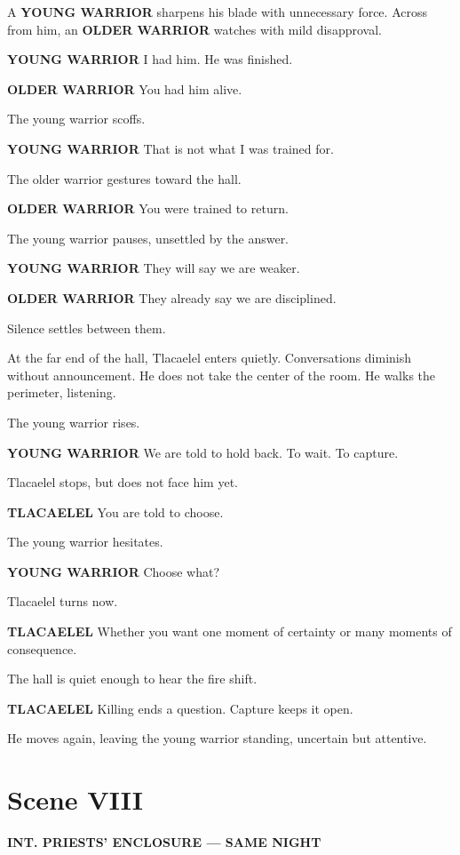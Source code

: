 \documentclass[12pt]{article}
\begin{document}
A \textbf{YOUNG WARRIOR} sharpens his blade with unnecessary force. Across from him, an \textbf{OLDER WARRIOR} watches with mild disapproval.

\textbf{YOUNG WARRIOR}  
I had him. He was finished.

\textbf{OLDER WARRIOR}  
You had him alive.

The young warrior scoffs.

\textbf{YOUNG WARRIOR}  
That is not what I was trained for.

The older warrior gestures toward the hall.

\textbf{OLDER WARRIOR}  
You were trained to return.

The young warrior pauses, unsettled by the answer.

\textbf{YOUNG WARRIOR}  
They will say we are weaker.

\textbf{OLDER WARRIOR}  
They already say we are disciplined.

Silence settles between them.

At the far end of the hall, Tlacaelel enters quietly. Conversations diminish without announcement. He does not take the center of the room. He walks the perimeter, listening.

The young warrior rises.

\textbf{YOUNG WARRIOR}  
We are told to hold back. To wait. To capture.

Tlacaelel stops, but does not face him yet.

\textbf{TLACAELEL}  
You are told to choose.

The young warrior hesitates.

\textbf{YOUNG WARRIOR}  
Choose what?

Tlacaelel turns now.

\textbf{TLACAELEL}  
Whether you want one moment of certainty or many moments of consequence.

The hall is quiet enough to hear the fire shift.

\textbf{TLACAELEL}  
Killing ends a question.  
Capture keeps it open.

He moves again, leaving the young warrior standing, uncertain but attentive.

\section*{Scene VIII}

\textbf{INT. PRIESTS’ ENCLOSURE --- SAME NIGHT}
\end{document}
